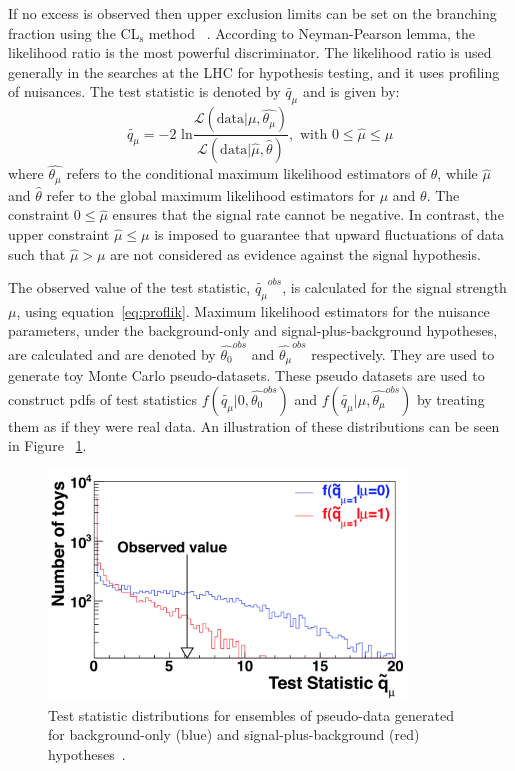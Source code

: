 If no excess is observed then upper exclusion limits can be set on the branching fraction using the CL$_\text{s}$ method ~\cite{Read:2002hq, Read:2000ru, Junk:1999kv}. According to Neyman-Pearson lemma, the likelihood ratio is the most powerful discriminator. The likelihood ratio is used generally in the searches at the LHC for hypothesis testing, and it uses profiling of nuisances. The test statistic is denoted by $\tilde{q_\mu}$ and is given by:
\begin{equation}
\label{eq:proflik}
  \tilde{q_\mu}=-2\text{ ln}\frac{\mathcal{L}(\text{data}|\mu,\hat{\theta_\mu})}{\mathcal{L}(\text{data}|\hat{\mu},\hat{\theta})},\text{   with  } 0 \leq \hat{\mu} \leq \mu
\end{equation}
where $\hat{\theta_\mu}$ refers to the conditional maximum likelihood estimators of $\theta$, while $\hat\mu$ and $\hat\theta$ refer to the global maximum likelihood estimators for $\mu$ and $\theta$. The constraint $0 \leq \hat{\mu}$ ensures that the signal rate cannot be negative. In contrast, the upper constraint $\hat{\mu} \leq \mu$ is imposed to guarantee that upward fluctuations of data such that $\hat{\mu} > \mu$ are not considered as evidence against the signal hypothesis.

The observed value of the test statistic, $\tilde{q_\mu}^{obs}$, is calculated for the signal strength $\mu$, using equation~\ref{eq:proflik}. Maximum likelihood estimators for the nuisance parameters, under the background-only and signal-plus-background hypotheses, are calculated and are denoted by $\hat{\theta_{0}}^{obs}$ and $\hat{\theta_\mu}^{obs}$ respectively. They are used to generate toy Monte Carlo pseudo-datasets. These pseudo datasets are used to construct pdfs of test statistics $f(\tilde{q_\mu}|0,\hat{\theta_{0}}^{obs})$ and $f(\tilde{q_\mu}|\mu,\hat{\theta_\mu}^{obs})$ by treating them as if they were real data. An illustration of these distributions can be seen in Figure ~\ref{fig:test_stat_dist}.
\begin{figure}[!htpb]\centering
 \captionsetup{width=.87\textwidth,justification=centering}
 \includegraphics[width=0.85\textwidth]{plots/chapter8/test_statistic_distri.png}
 \caption{Test statistic distributions for ensembles of pseudo-data generated for background-only (blue) and signal-plus-background (red) hypotheses~\cite{ATLAS:2011tau}.}
 \label{fig:test_stat_dist}
\end{figure}

